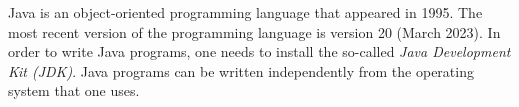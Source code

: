 Java is an object-oriented programming language that appeared in 1995. The most recent version of the programming language is version 20 (March 2023). In order to write Java programs, one needs to install the so-called \emph{Java Development Kit (JDK)}. Java programs can be written independently from the operating system that one uses.